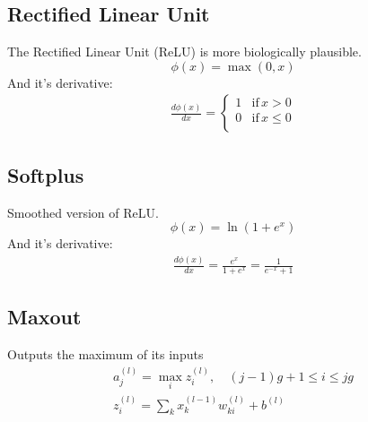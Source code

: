 \subsection{Rectified Linear Unit}
The Rectified Linear Unit (ReLU) is more biologically plausible.
\begin{equation}
\phi(x) = \max(0, x)
\end{equation}
And it's derivative:
\begin{align*}
\frac{d\phi(x)}{dx} = 
	\begin{cases}
		1 & \text{if}\, x > 0\\
		0 & \text{if}\, x \leq 0\\
	\end{cases}
\end{align*}

\subsection{Softplus}
Smoothed version of ReLU.
\begin{equation}\label{eq:softplus}
\phi(x) = \ln(1 + e^x)
\end{equation}
And it's derivative:
\begin{align*}
\frac{d\phi(x)}{dx} = \frac{e^x}{1 + e^x} = \frac{1}{e^{-x} + 1}
\end{align*}

\subsection{Maxout}
Outputs the maximum of its inputs
\begin{align}
a_j^{(l)} = \max_i z_i^{(l)}, \quad (j-1)g +1 \leq i \leq j g \\
z_i^{(l)} = \sum_k x_k^{(l-1)} w_{ki}^{(l)} + b^{(l)}
\end{align}